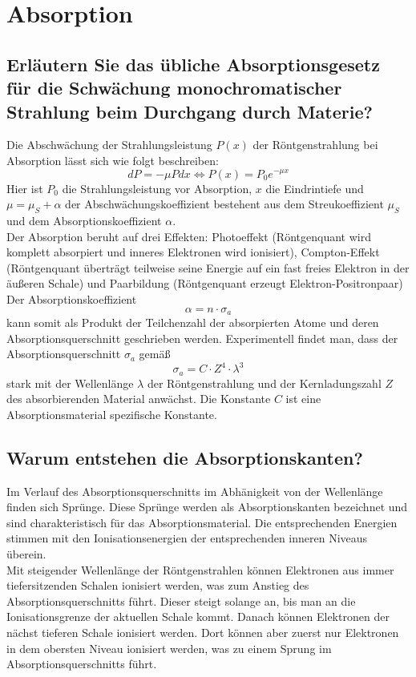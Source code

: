 \section{Absorption}
\subsection*{Erläutern Sie das übliche Absorptionsgesetz für die Schwächung monochromatischer Strahlung beim Durchgang durch Materie?}
Die Abschwächung der Strahlungsleistung $P(x)$ der Röntgenstrahlung bei Absorption lässt sich wie folgt beschreiben:
\begin{equation}
    dP = -\mu P dx \Leftrightarrow P(x)=P_0e^{-\mu x}
\end{equation}
Hier ist $P_0$ die Strahlungsleistung vor Absorption, $x$ die Eindrintiefe und $\mu = \mu_S+\alpha$ der Abschwächungskoeffizient bestehent aus dem Streukoeffizient $\mu_S$ und dem Absorptionskoeffizient $\alpha$. \cite{Experimentalphysik3}\\
Der Absorption beruht auf drei Effekten: Photoeffekt (Röntgenquant wird komplett absorpiert und inneres Elektronen wird ionisiert), Compton-Effekt (Röntgenquant überträgt teilweise seine Energie auf ein fast freies Elektron in der äußeren Schale) und Paarbildung (Röntgenquant erzeugt Elektron-Positronpaar)\\
Der Absorptionskoeffizient
\begin{equation}
    \alpha=n\cdot \sigma_a
\end{equation}
kann somit als Produkt der Teilchenzahl der absorpierten Atome und deren Absorptionsquerschnitt geschrieben werden.
Experimentell findet man, dass der Absorptionsquerschnitt $\sigma_a$ gemäß
\begin{equation}
    \sigma_a=C\cdot Z^4 \cdot \lambda^3
\end{equation}
stark mit der Wellenlänge $\lambda$ der Röntgenstrahlung und der Kernladungszahl $Z$ des absorbierenden Material anwächst.
Die Konstante $C$ ist eine Absorptionsmaterial spezifische Konstante. \cite{Experimentalphysik3}
\subsection*{Warum entstehen die Absorptionskanten?}
Im Verlauf des Absorptionsquerschnitts im Abhänigkeit von der Wellenlänge finden sich Sprünge.
Diese Sprünge werden als Absorptionskanten bezeichnet und sind charakteristisch für das Absorptionsmaterial.
Die entsprechenden Energien stimmen mit den Ionisationsenergien der entsprechenden inneren Niveaus überein.\vspace{6pt}\\
Mit steigender Wellenlänge der Röntgenstrahlen können Elektronen aus immer tiefersitzenden Schalen ionisiert werden, was zum Anstieg des Absorptionsquerschnitts führt.
Dieser steigt solange an, bis man an die Ionisationsgrenze der aktuellen Schale kommt.
Danach können Elektronen der nächst tieferen Schale ionisiert werden.
Dort können aber zuerst nur Elektronen in dem obersten Niveau ionisiert werden, was zu einem Sprung im Absorptionsquerschnitts führt. \cite{Experimentalphysik3}
